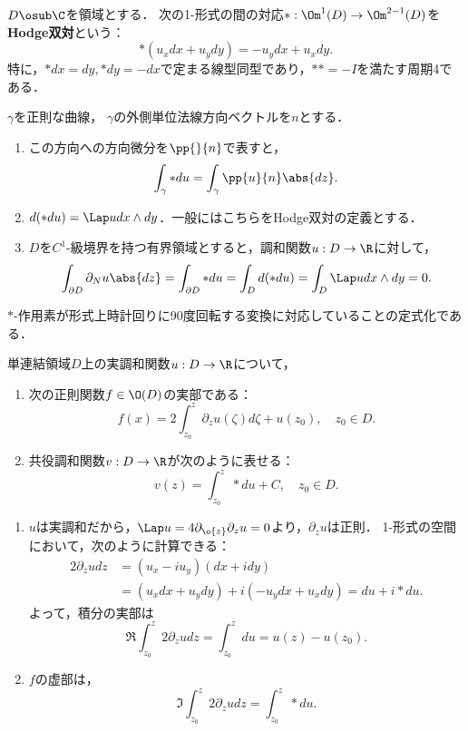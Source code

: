 \documentclass[uplatex,dvipdfmx]{jsreport}
\begin{document}
\begin{definition}
    $D\osub\C$を領域とする．
    次の1-形式の間の対応$*:\Om^1(D)\to\Om^{2-1}(D)$を\textbf{Hodge双対}という：
    \[*(u_xdx+u_ydy)=-u_ydx+u_xdy.\]
    特に，$*dx=dy,*dy=-dx$で定まる線型同型であり，$**=-I$を満たす周期4である．
\end{definition}
\begin{lemma}[$\C$上のHodge双対の意味]\label{lemma-Hodge-star}
    $\gamma$を正則な曲線，
    $\gamma$の外側単位法線方向ベクトルを$n$とする．
    \begin{enumerate}
        \item この方向への方向微分を$\pp{}{n}$で表すと，
        \[\int_\gamma *du=\int_{\gamma}\pp{u}{n}\abs{dz}.\]
        \item $d(*du)=\Lap udx\land dy$．一般にはこちらをHodge双対の定義とする．
        \item $D$を$C^1$-級境界を持つ有界領域とすると，調和関数$u:D\to\R$に対して，
        \[\int_{\partial D}\partial_Nu\abs{dz}=\int_{\partial D}*du=\int_Dd(*du)=\int_D\Lap udx\wedge dy=0.\]
    \end{enumerate}
\end{lemma}
\begin{remarks}
    $*$-作用素が形式上時計回りに90度回転する変換に対応していることの定式化である．
\end{remarks}

\begin{theorem}[単連結領域上の調和関数には共役が存在する]
    単連結領域$D$上の実調和関数$u:D\to\R$について，
    \begin{enumerate}
        \item 次の正則関数$f\in\O(D)$の実部である：
        \[f(x)=2\int^z_{z_0}\partial_zu(\zeta)d\zeta+u(z_0),\quad z_0\in D.\]
        \item 共役調和関数$v:D\to\R$が次のように表せる：
        \[v(z)=\int^z_{z_0}*du+C,\quad z_0\in D.\]
    \end{enumerate}
\end{theorem}
\begin{Proof}\mbox{}
    \begin{enumerate}
        \item $u$は実調和だから，$\Lap u=4\partial_{\o{z}}\partial_{z}u=0$より，$\partial_zu$は正則．
        1-形式の空間において，次のように計算できる：
        \begin{align*}
            2\partial_zudz&=(u_x-iu_y)(dx+idy)\\
            &=(u_xdx+u_ydy)+i(-u_ydx+u_xdy)
            =du+i*du.
        \end{align*}
        よって，積分の実部は
        \[\Re\int^z_{z_0}2\partial_zudz=\int^z_{z_0}du=u(z)-u(z_0).\]
        \item $f$の虚部は，
        \[\Im\int^z_{z_0}2\partial_zudz=\int^z_{z_0}*du.\]
    \end{enumerate}
\end{Proof}
\end{document}
